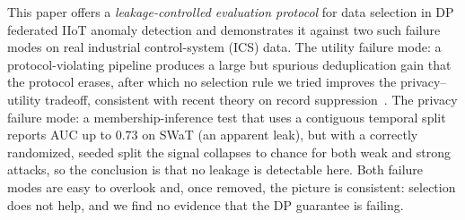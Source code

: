 \documentclass[pdflatex,sn-mathphys-num]{sn-jnl}
\theoremstyle{thmstyleone}
\theoremstyle{thmstyletwo}
\theoremstyle{thmstylethree}
\begin{document}
This paper offers a \emph{leakage-controlled evaluation protocol} for data selection in
DP federated IIoT anomaly detection and demonstrates it against two such failure modes on real
industrial control-system (ICS) data. The utility failure mode: a protocol-violating pipeline produces a large but spurious deduplication gain that the protocol
erases, after which no selection rule we tried improves the privacy--utility tradeoff,
consistent with recent theory on record suppression~\cite{stoddard2026suppress}. The privacy failure mode: a membership-inference test that uses a contiguous temporal split
reports AUC up to $0.73$ on SWaT (an apparent leak), but with a correctly randomized,
seeded split the signal collapses to chance for both weak and strong attacks, so the conclusion is that no leakage is detectable here. Both failure modes are easy to overlook and, once removed, the picture is consistent: selection does not help, and we
find no evidence that the DP guarantee is failing.
\end{document}
